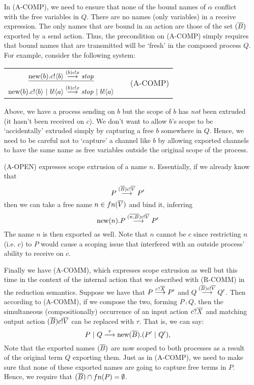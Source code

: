 In (A-COMP), we need to ensure that none of the bound names of $\alpha$ conflict with the free variables in $Q$.  
There are no names (only variables) in a receive expression.  
The only names that are bound in an action are those of the set $({\overline{B}})$ exported by a send action.  
Thus, the precondition on (A-COMP) simply requires that bound names that are transmitted will be `fresh' in the composed process $Q$.  
For example, consider the following system:
\begin{center}\begin{tabular}{rllll}
	\multicolumn{3}{c}{$\underline{\text{new}({b}).{c}!\langle{b}\rangle\overset{{({b}){c}!{x}}}{\longrightarrow} \mbox{\emph{stop}}}$} & & \multirow{2}{*}{\tiny{(A-COMP)}}\\
	\multicolumn{3}{c}{$\text{new}({b}).{c}!\langle{b}\rangle \ |\  {b}!\langle{a}\rangle\overset{{({b}){c}!{x}}}{\longrightarrow} \mbox{\emph{stop}}\ |\  {b}!\langle{a}\rangle$}\\[10pt]
\end{tabular}\end{center}
Above, we have a process sending on $b$ but the scope of $b$ has \emph{not} been extruded (it hasn't been received on $c$).
We don't want to allow $b$'s scope to be `accidentally' extruded simply by capturing a free $b$ somewhere in $Q$.
Hence, we need to be careful not to `capture' a channel like $b$ by allowing exported channels to have the same name as free variables outside the original scope of the process.

(A-OPEN) expresses scope extrusion of a name $n$.  
Essentially, if we already know that 
\[
	P\overset{{({\overline{B}}){c}!{\overline{V}}}}{\longrightarrow} P'
\]
then we can take a free name $n\in fn(\overline{V})$ and bind it, inferring
\[
	\text{new}({n}). P\overset{{({\overline{n,B}}){c}!{\overline{V}}}}{\longrightarrow} P'
\]
The name $n$ is then exported as well.
Note that $n$ cannot be $c$ since restricting $n$ (i.e. $c$) to $P$ would cause a scoping issue that interfered with an outside process' ability to receive on $c$.

Finally we have (A-COMM), which expresses scope extrusion as well but this time in the context of the internal action that we described with (R-COMM) in the reduction semantics.  
Suppose we have that $P \overset{{{c}?{\overline{X}}}}{\longrightarrow} P'$ and $Q \overset{{({\overline{B}}){c}!{\overline{V}}}}{\longrightarrow} Q'$.
Then according to (A-COMM), if we compose the two, forming $P\comp Q$, then the simultaneous (compositionally) occurrence of an input action ${c}?{\overline{X}}$ and matching output action $({\overline{B}}){c}!{\overline{V}}$ can be replaced with $\tau$.
That is, we can say:
\[
	P\ |\  Q \overset{{\tau}}{\longrightarrow} \text{new}({\overline{B}}).(P'\ |\  Q'),
\]
Note that the exported names $({\overline{B}})$ are now scoped to both processes as a result of the original term $Q$ exporting them.  
Just as in (A-COMP), we need to make sure that none of these exported names are going to capture free terms in $P$.  
Hence, we require that $({\overline{B}})\cap fn(P) = \emptyset$.

